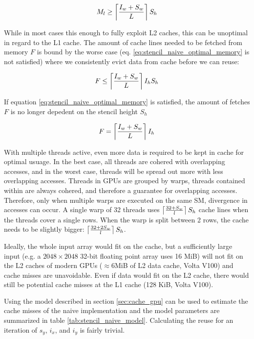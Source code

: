 \begin{equation}
    M_l \geq \left\lceil \frac{I_w + S_w}{L} \right\rceil S_h \label{eq:stencil_naive_optimal_memory}
\end{equation}

While in most cases  this enough to fully exploit L2 caches, this can be unoptimal in regard to the L1 cache.
The amount of cache lines needed to be fetched from memory $F$ is bound by the worse case (eq. \ref{eq:stencil_naive_optimal_memory} is not satisfied) where we consistently evict data from cache before we can reuse:

\[
    F \leq \left\lceil \frac{I_w + S_w}{L} \right\rceil I_h S_h
\]

If equation \ref{eq:stencil_naive_optimal_memory} is satisfied, the amount of fetches $F$ is no longer depedent on the stencil height $S_h$

\[
    F = \left\lceil \frac{I_w + S_w}{L} \right\rceil I_h
\]

With multiple threads active, even more data is required to be kept in cache for optimal usuage.
In the best case, all threads are cohered with overlapping accesses, and in the worst case, threads will be spread out more with less overlapping accesses.
Threads in GPUs are grouped by warps, threads contained within are always cohered, and therefore a guarantee for overlapping accesses.
Therefore, only when multiple warps are executed on the same SM, divergence in accesses can occur.
A single warp of 32 threads uses $\left\lceil \frac{32 + S_w}{l} \right\rceil S_h$ cache lines when the threads cover a single rows. 
When the warp is split between 2 rows, the cache needs to be slightly bigger: $\left\lceil \frac{32 + 2 S_w}{l} \right\rceil S_h$.

Ideally, the whole input array would fit on the cache, but a sufficiently large input (e.g. a $2048\times2048$ 32-bit floating point array uses 16 MiB) will not fit on the L2 caches of modern GPUs ($\approx6$MiB of L2 data cache, Volta V100) and cache misses are unavoidable.
Even if data would fit on the L2 cache, there would still be potential cache misses at the L1 cache (128 KiB, Volta V100).


\vspace{2cm}

Using the model described in section \ref{sec:cache_gpu} can be used to estimate the cache misses of the naive implementation and the model parameters are summarized in table \ref{tab:stencil_naive_model}.
Calculating the reuse for an iteration of $s_y$, $i_x$, and $i_y$ is fairly trivial.

